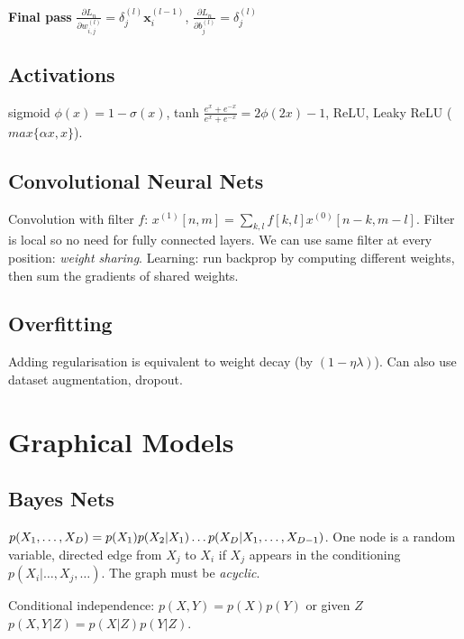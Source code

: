 \textbf{Final pass} \newline
$\frac{\partial{L}_n}{\partial w_{i,j}^{(l)}} = \delta^{(l)}_j \mathbf{x}_i^{(l-1)}$, $\frac{\partial{L}_n}{\partial b_{j}^{(l)}} = \delta_j^{(l)}$

\subsection{Activations}
sigmoid $\phi(x) = 1 -\sigma(x)$, tanh $\frac{e^x+e^{-x}}{e^x+e^{-x}} = 2 \phi(2x)-1$, ReLU, Leaky ReLU ($max\{\alpha x, x\}$).

\subsection{Convolutional Neural Nets}
Convolution with filter $f$: $x^{(1)}[n,m] = \sum_{k,l} f[k,l]x^{(0)}[n-k, m-l]$. Filter is local so no need for fully connected layers. We can use same filter at every position: \textit{weight sharing}. Learning: run backprop by computing different weights, then sum the gradients of shared weights.

\subsection{Overfitting}
Adding regularisation is equivalent to weight decay (by $(1-\eta\lambda)$). Can also use dataset augmentation, dropout.


\section{Graphical Models}
\subsection{Bayes Nets}
$p(X_1,\dots,X_D) = p(X_1)p(X_2|X_1)\dots\newline p(X_D|X_1,\dots,X_{D-1})$. One node is a random variable, directed edge from $X_j$ to $X_i$ if $X_j$ appears in the conditioning $p(X_i|\dots,X_j,\dots)$. The graph must be \textit{acyclic}.

Conditional independence: $p(X,Y)=p(X)p(Y)$ or given $Z$ $p(X,Y|Z)=p(X|Z)p(Y|Z)$.

